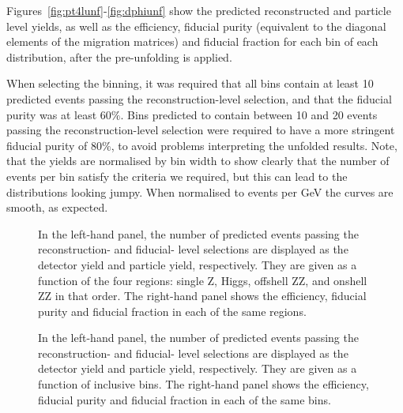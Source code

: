 Figures~\ref{fig:pt4lunf}-\ref{fig:dphiunf} show the predicted reconstructed and particle level yields, as well as the efficiency, fiducial purity (equivalent to the diagonal elements of the migration matrices) and fiducial fraction for each bin of each distribution, after the pre-unfolding is applied.  

When selecting the binning, it was required that all bins contain at least 10 predicted events passing the reconstruction-level selection, and that the fiducial purity was at least 60$\%$. Bins predicted to contain between 10 and 20 events passing the reconstruction-level selection were required to have a more stringent fiducial purity of 80$\%$, to avoid problems interpreting the unfolded results. Note, that the yields are normalised by bin width to show clearly that the number of events per bin satisfy the criteria we required, but this can lead to the distributions looking jumpy. When normalised to events per GeV the curves are smooth, as expected. 

\begin{figure}[htb]
  \centering 
\caption{In the left-hand panel, the number of predicted events passing the reconstruction- and fiducial- level selections are displayed as the detector yield and particle yield, respectively. They are given as a function of the four \mFourL regions: single Z, Higgs,  offshell ZZ, and onshell ZZ in that order. The right-hand panel shows the efficiency, fiducial purity and fiducial fraction in each of the same \mFourL regions.}
  \label{fig:inclvm4lunf}
 \end{figure}  

\begin{figure}[htb]
  \centering 
\caption{In the left-hand panel, the number of predicted events passing the reconstruction- and fiducial- level selections are displayed as the detector yield and particle yield, respectively. They are given as a function of inclusive \mFourL bins. The right-hand panel shows the efficiency, fiducial purity and fiducial fraction in each of the same \mFourL bins.}
 \end{figure} 

